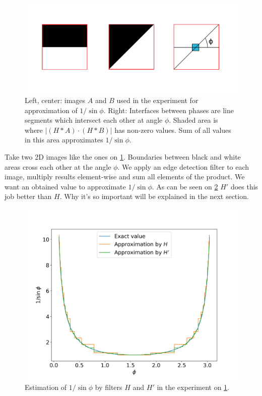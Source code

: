 \documentclass[reprint,amsmath,amssymb,aps,pre,showkeys,showpacs]{revtex4-1}
\begin{document}
\begin{figure}
  \centering
  \includegraphics[width=0.8\linewidth]{images/experiment-setup.png}
  \caption[]{Left, center: images $A$ and $B$ used in the experiment for
    approximation of $1 / \sin \phi$. Right: Interfaces between phases are
    line segments which intersect each other at angle $\phi$. Shaded area is
    where $|(H*A)\cdot(H*B)|$ has non-zero values. Sum of all values in this
    area approximates $1 / \sin \phi$.}
  \label{fig:experiment-setup}
\end{figure}
Take two 2D images like the ones on \cref{fig:experiment-setup}. Boundaries
between black and white areas cross each other at the angle $\phi$. We apply an
edge detection filter to each image, multiply results element-wise and sum all
elements of the product. We want an obtained value to approximate
$1/\sin \phi$. As can be seen on \cref{fig:filter-comparison} $H'$ does this job
better than $H$. Why it's so important will be explained in the next section.
\begin{figure}
  \centering
  \includegraphics[width=0.8\linewidth]{images/filter-comparison.png}
  \caption[]{Estimation of $1/\sin\phi$ by filters $H$ and $H'$ in the
    experiment on \cref{fig:experiment-setup}.}
  \label{fig:filter-comparison}
\end{figure}
\end{document}
